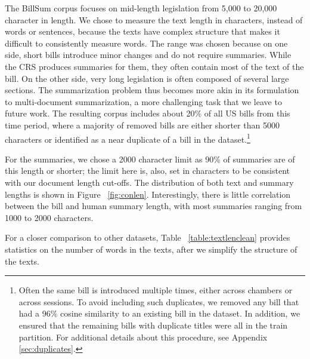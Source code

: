 \documentclass[11pt,a4paper]{article}
\begin{document}
The BillSum corpus focuses on mid-length legislation from 5,000 to 20,000 character in length. We chose to measure the text length in characters, instead of words or sentences, because the texts have complex structure that makes it difficult to consistently measure words. The range was chosen because on one side, short bills introduce minor changes and do not require summaries. While the CRS produces summaries for them, they often contain most of the text of the bill. On the other side, very long legislation is often composed of several large sections. The summarization problem thus becomes more akin in its formulation to multi-document summarization, a more challenging task that we leave to future work. The resulting corpus includes about 20\% of all US bills from this time period, where a majority of removed bills are either shorter than 5000 characters or identified as a near duplicate of a bill in the dataset.\footnote{Often the same bill is introduced multiple times, either across chambers or across sessions. To avoid including such duplicates, we removed any bill that had a 96\% cosine similarity to an existing bill in the dataset. In addition, we ensured that the remaining bills with duplicate titles were all in the train partition. For additional details about this procedure, see Appendix \ref{sec:duplicates}.}



For the summaries, we chose a 2000 character limit as 90\% of summaries are of this length or shorter; the limit here is, also, set in characters to be consistent with our document length cut-offs. The distribution of both text and summary lengths is shown in Figure ~\ref{fig:conlen}. Interestingly, there is little correlation between the bill and human summary length, with most summaries ranging from 1000 to 2000 characters.

For a closer comparison to other datasets, Table ~\ref{table:textlenclean} provides statistics on the number of words in the texts, after we simplify the structure of the texts.
\end{document}
